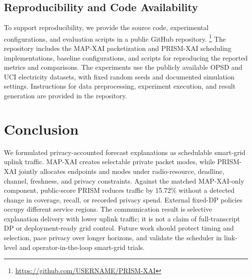 \documentclass[conference]{IEEEtran}
\begin{document}
\subsection{Reproducibility and Code Availability}

To support reproducibility, we provide the source
code, experimental configurations, and evaluation
scripts in a public GitHub repository. \footnote{
\url{https://github.com/USERNAME/PRISM-XAI}}
The repository includes the MAP-XAI packetization
and PRISM-XAI scheduling implementations, baseline
configurations, and scripts for reproducing the
reported metrics and comparisons. The experiments
use the publicly available OPSD and UCI electricity
datasets, with fixed random seeds and documented
simulation settings. Instructions for data
preprocessing, experiment execution, and result
generation are provided in the repository.


\section{Conclusion}

We formulated privacy-accounted forecast explanations as schedulable
smart-grid uplink traffic. MAP-XAI creates selectable private packet modes,
while PRISM-XAI jointly allocates endpoints and modes under radio-resource,
deadline, channel, freshness, and privacy constraints. Against the matched
MAP-XAI-only component, public-score PRISM reduces traffic by 15.72\% without
a detected change in coverage, recall, or recorded privacy spend. External
fixed-DP policies occupy different service regions. The communication result
is selective explanation delivery with lower uplink traffic; it is not a claim
of full-transcript DP or deployment-ready grid control. Future work should
protect timing and selection, pace privacy over longer horizons, and validate
the scheduler in link-level and operator-in-the-loop smart-grid trials.
\end{document}
